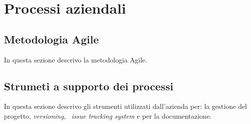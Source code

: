 \section{Processi aziendali}

\subsection{Metodologia Agile}
In questa sezione descrivo la metodologia Agile.

\subsection{Strumeti a supporto dei processi}
In questa sezione descrivo gli strumenti utilizzati dall'azienda per: la gestione del progetto, \emph{versioning}, \
\emph{issue tracking system} e per la documentazione.
